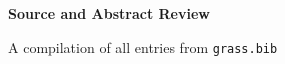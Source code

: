 \documentclass[11pt, letterpaper]{article}
\begin{document}
\begin{center}
    \huge\textbf{Source and Abstract Review}
    \vspace{0.5em}
    
    \large A compilation of all entries from \texttt{grass.bib}
\end{center}

\nocite{*}

\printbibliography[title={All Sources and Abstracts}]
\end{document}
